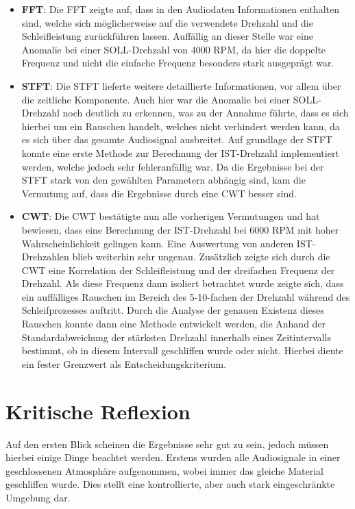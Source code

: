 \begin{itemize}
    \item \textbf{\ac{FFT}}:
        Die \ac{FFT} zeigte auf, dass in den Audiodaten Informationen enthalten sind, welche sich möglicherweise auf die verwendete Drehzahl und die Schleifleistung zurückführen lassen. Auffällig an dieser Stelle war eine Anomalie bei einer SOLL-Drehzahl von 4000 RPM, da hier die doppelte Frequenz und nicht die einfache Frequenz besonders stark ausgeprägt war.
    \item \textbf{\ac{STFT}}:
        Die \ac{STFT} lieferte weitere detaillierte Informationen, vor allem über die zeitliche Komponente. Auch hier war die Anomalie bei einer SOLL-Drehzahl noch deutlich zu erkennen, was zu der Annahme führte, dass es sich hierbei um ein Rauschen handelt, welches nicht verhindert werden kann, da es sich über das gesamte Audiosignal ausbreitet. Auf grundlage der STFT konnte eine erste Methode zur Berechnung der IST-Drehzahl implementiert werden, welche jedoch sehr fehleranfällig war. Da die Ergebnisse bei der \ac{STFT} stark von den gewählten Parametern abhängig sind, kam die Vermutung auf, dass die Ergebnisse durch eine \ac{CWT} besser sind.

    \item \textbf{\ac{CWT}}:
        Die \ac{CWT} bestätigte nun alle vorherigen Vermutungen und hat bewiesen, dass eine Berechnung der IST-Drehzahl bei 6000 RPM mit hoher Wahrscheinlichkeit gelingen kann. Eine Auswertung von anderen IST-Drehzahlen blieb weiterhin sehr ungenau. Zusätzlich zeigte sich durch die CWT eine Korrelation der Schleifleistung und der dreifachen Frequenz der Drehzahl. Als diese Frequenz dann isoliert betrachtet wurde zeigte sich, dass ein auffälliges Rauschen im Bereich des 5-10-fachen der Drehzahl während des Schleifprozesses auftritt. Durch die Analyse der genauen Existenz dieses Rauschen konnte dann eine Methode entwickelt werden, die Anhand der Standardabweichung der stärksten Drehzahl innerhalb eines Zeitintervalls bestimmt, ob in diesem Intervall geschliffen wurde oder nicht. Hierbei diente ein fester Grenzwert  als Entscheidungskriterium.
\end{itemize}


\section{Kritische Reflexion}

Auf den ersten Blick scheinen die Ergebnisse sehr gut zu sein, jedoch müssen hierbei einige Dinge beachtet werden. Erstens wurden alle Audiosignale in einer geschlossenen Atmosphäre aufgenommen, wobei immer das gleiche Material geschliffen wurde. Dies stellt eine kontrollierte, aber auch stark eingeschränkte Umgebung dar. 

